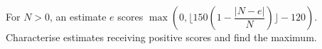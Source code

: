 For $N>0$, an estimate $e$ scores $\max(0,\lfloor150(1-\dfrac{|N-e|}{N})\rfloor-120)$. Characterise estimates receiving positive scores and find the maximum.
